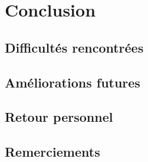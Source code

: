\chapter{Conclusion}
\label{ch:conclusion}

\section{Difficultés rencontrées}

\section{Améliorations futures}

\section{Retour personnel}

\section{Remerciements}